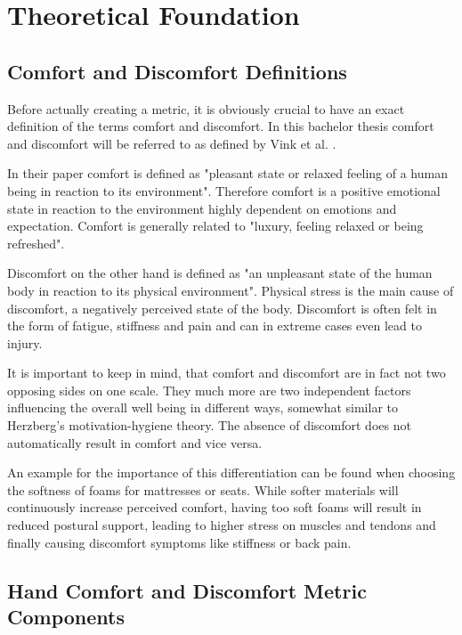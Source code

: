 


\chapter{Theoretical Foundation}\label{chapter:theory}

\section{Comfort and Discomfort Definitions}

Before actually creating a metric, it is obviously crucial to have an exact definition of the terms comfort and discomfort. In this bachelor thesis comfort and discomfort will be referred to as defined by Vink et al. \cite{vink2012editorial}.

In their paper comfort is defined as "pleasant state or relaxed feeling of a human being in reaction to its environment". Therefore comfort is a positive emotional state in reaction to the environment highly dependent on emotions and expectation. Comfort is generally related to "luxury, feeling relaxed or being refreshed".

Discomfort on the other hand is defined as "an unpleasant state of the human body in reaction to its physical environment". Physical stress is the main cause of discomfort, a negatively perceived state of the body. Discomfort is often felt in the form of fatigue, stiffness and pain and can in extreme cases even lead to injury.

It is important to keep in mind, that comfort and discomfort are in fact not two opposing sides on one scale. They much more are two independent factors influencing the overall well being in different ways, somewhat similar to Herzberg's motivation-hygiene theory. The absence of discomfort does not automatically result in comfort and vice versa. 

An example for the importance of this differentiation can be found when choosing the softness of foams for mattresses or seats. While softer materials will continuously increase perceived comfort, having too soft foams will result in reduced postural support, leading to higher stress on muscles and tendons and finally causing discomfort symptoms like stiffness or back pain. 

\section{Hand Comfort and Discomfort Metric Components}

